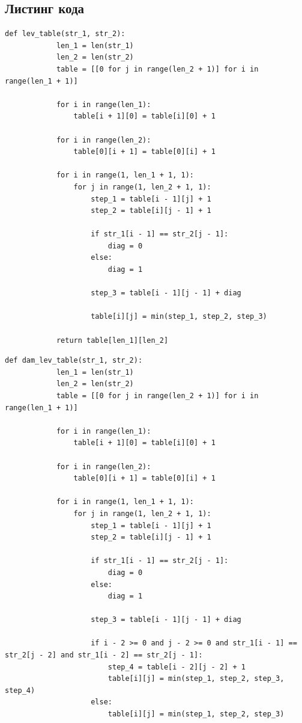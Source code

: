 \documentclass[a4paper, 14pt]{article}
\begin{document}
\begin{center}
        \subsection{Листинг кода}
        \begin{flushleft}
        \parindent=1cm
        \begin{lstlisting}[label=some-code,caption=Функция нахождения расстояния Левенштейна итеративно]
  		def lev_table(str_1, str_2):
			len_1 = len(str_1)
			len_2 = len(str_2)
			table = [[0 for j in range(len_2 + 1)] for i in range(len_1 + 1)]

			for i in range(len_1):
				table[i + 1][0] = table[i][0] + 1

			for i in range(len_2):
				table[0][i + 1] = table[0][i] + 1

			for i in range(1, len_1 + 1, 1):
				for j in range(1, len_2 + 1, 1):
					step_1 = table[i - 1][j] + 1
					step_2 = table[i][j - 1] + 1

					if str_1[i - 1] == str_2[j - 1]:
						diag = 0
					else:
						diag = 1

					step_3 = table[i - 1][j - 1] + diag

					table[i][j] = min(step_1, step_2, step_3)

			return table[len_1][len_2]
        \end{lstlisting}
        \begin{lstlisting}[label=some-code,caption=Функция нахождения расстояния Дамерау-Левенштейна итеративно]
		def dam_lev_table(str_1, str_2):
			len_1 = len(str_1)
			len_2 = len(str_2)
			table = [[0 for j in range(len_2 + 1)] for i in range(len_1 + 1)]

			for i in range(len_1):
				table[i + 1][0] = table[i][0] + 1

			for i in range(len_2):
				table[0][i + 1] = table[0][i] + 1

			for i in range(1, len_1 + 1, 1):
				for j in range(1, len_2 + 1, 1):
					step_1 = table[i - 1][j] + 1
					step_2 = table[i][j - 1] + 1

					if str_1[i - 1] == str_2[j - 1]:
						diag = 0
					else:
						diag = 1

					step_3 = table[i - 1][j - 1] + diag

					if i - 2 >= 0 and j - 2 >= 0 and str_1[i - 1] == str_2[j - 2] and str_1[i - 2] == str_2[j - 1]:
						step_4 = table[i - 2][j - 2] + 1
						table[i][j] = min(step_1, step_2, step_3, step_4)
					else:
						table[i][j] = min(step_1, step_2, step_3)


\end{lstlisting}
\end{flushleft}
\end{center}
\end{document}
